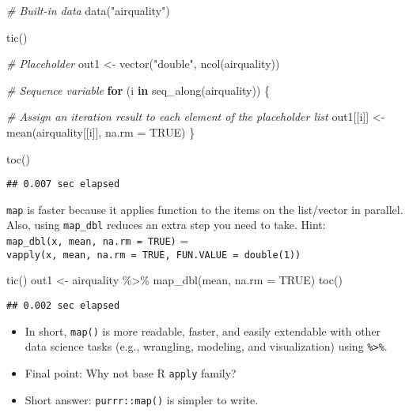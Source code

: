 \documentclass[
]{book}
\newenvironment{Shaded}{\begin{snugshade}}{\end{snugshade}}
\newcommand{\AttributeTok}[1]{\textcolor[rgb]{0.77,0.63,0.00}{#1}}
\newcommand{\CommentTok}[1]{\textcolor[rgb]{0.56,0.35,0.01}{\textit{#1}}}
\newcommand{\ConstantTok}[1]{\textcolor[rgb]{0.00,0.00,0.00}{#1}}
\newcommand{\ControlFlowTok}[1]{\textcolor[rgb]{0.13,0.29,0.53}{\textbf{#1}}}
\newcommand{\FunctionTok}[1]{\textcolor[rgb]{0.00,0.00,0.00}{#1}}
\newcommand{\NormalTok}[1]{#1}
\newcommand{\OtherTok}[1]{\textcolor[rgb]{0.56,0.35,0.01}{#1}}
\newcommand{\SpecialCharTok}[1]{\textcolor[rgb]{0.00,0.00,0.00}{#1}}
\newcommand{\StringTok}[1]{\textcolor[rgb]{0.31,0.60,0.02}{#1}}
\begin{document}
\begin{Shaded}
\begin{Highlighting}[]
\CommentTok{\# Built{-}in data}
\FunctionTok{data}\NormalTok{(}\StringTok{"airquality"}\NormalTok{)}

\FunctionTok{tic}\NormalTok{()}

\CommentTok{\# Placeholder}
\NormalTok{out1 }\OtherTok{\textless{}{-}} \FunctionTok{vector}\NormalTok{(}\StringTok{"double"}\NormalTok{, }\FunctionTok{ncol}\NormalTok{(airquality))}

\CommentTok{\# Sequence variable}
\ControlFlowTok{for}\NormalTok{ (i }\ControlFlowTok{in} \FunctionTok{seq\_along}\NormalTok{(airquality)) \{ }

  \CommentTok{\# Assign an iteration result to each element of the placeholder list }
\NormalTok{  out1[[i]] }\OtherTok{\textless{}{-}} \FunctionTok{mean}\NormalTok{(airquality[[i]], }\AttributeTok{na.rm =} \ConstantTok{TRUE}\NormalTok{)}
\NormalTok{\}}

\FunctionTok{toc}\NormalTok{()}
\end{Highlighting}
\end{Shaded}

\begin{verbatim}
## 0.007 sec elapsed
\end{verbatim}

\texttt{map} is faster because it applies function to the items on the list/vector in parallel. Also, using \texttt{map\_dbl} reduces an extra step you need to take. Hint: \texttt{map\_dbl(x,\ mean,\ na.rm\ =\ TRUE)} = \texttt{vapply(x,\ mean,\ na.rm\ =\ TRUE,\ FUN.VALUE\ =\ double(1))}

\begin{Shaded}
\begin{Highlighting}[]
\FunctionTok{tic}\NormalTok{()}
\NormalTok{out1 }\OtherTok{\textless{}{-}}\NormalTok{ airquality }\SpecialCharTok{\%\textgreater{}\%} \FunctionTok{map\_dbl}\NormalTok{(mean, }\AttributeTok{na.rm =} \ConstantTok{TRUE}\NormalTok{)}
\FunctionTok{toc}\NormalTok{()}
\end{Highlighting}
\end{Shaded}

\begin{verbatim}
## 0.002 sec elapsed
\end{verbatim}

\begin{itemize}
\item
  In short, \texttt{map()} is more readable, faster, and easily extendable with other data science tasks (e.g., wrangling, modeling, and visualization) using \texttt{\%\textgreater{}\%}.
\item
  Final point: Why not base R \texttt{apply} family?
\item
  Short answer: \texttt{purrr::map()} is simpler to write.
\end{itemize}
\end{document}
